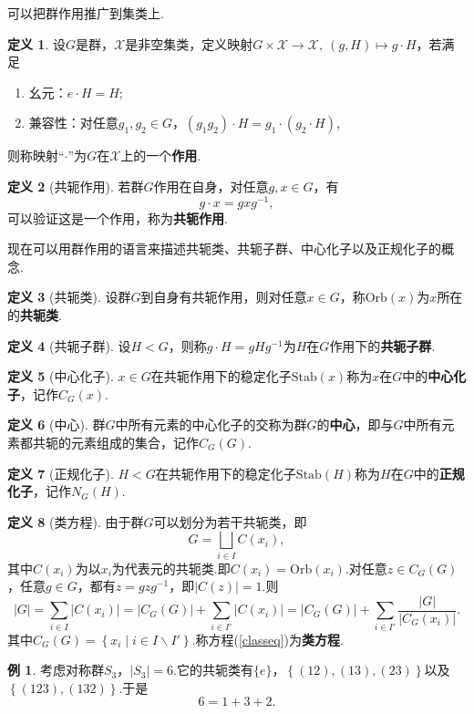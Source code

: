 \documentclass[12pt]{ctexart}
\theoremstyle{definition}
\newtheorem{definition}{定义}[section]
\newtheorem{example}{例}[section]
\theoremstyle{plain}
\newcommand{\Orb}{\mathrm{Orb}}
\newcommand{\Stab}{\mathrm{Stab}}
\begin{document}
可以把群作用推广到集类上.
\begin{definition}
	设$G$是群，$\mathcal{X}$是非空集类，定义映射$G\times \mathcal{X}\to \mathcal{X},\ (g,H)\mapsto g\cdot H$，若满足
	\begin{enumerate}
		\item 幺元：$e\cdot H=H$;
		\item 兼容性：对任意$g_1,g_2\in G$，$(g_1g_2)\cdot H=g_1\cdot(g_2\cdot H)$,
	\end{enumerate}
	则称映射“$\cdot$”为$G$在$\mathcal{X}$上的一个\textbf{作用}.
\end{definition}
\begin{definition}[共轭作用]
	若群$G$作用在自身，对任意$g,x\in G$，有
	$$g\cdot x=gxg^{-1},$$
	可以验证这是一个作用，称为\textbf{共轭作用}.
\end{definition}
现在可以用群作用的语言来描述共轭类、共轭子群、中心化子以及正规化子的概念.
\begin{definition}[共轭类]
	设群$G$到自身有共轭作用，则对任意$x\in G$，称$\Orb(x)$为$x$所在的\textbf{共轭类}.
\end{definition}
\begin{definition}[共轭子群]
	设$H<G$，则称$g\cdot H=gHg^{-1}$为$H$在$G$作用下的\textbf{共轭子群}.
\end{definition}
\begin{definition}[中心化子]
	$x\in G$在共轭作用下的稳定化子$\Stab(x)$称为$x$在$G$中的\textbf{中心化子}，记作$C_G(x)$.
\end{definition}
\begin{definition}[中心]
	群$G$中所有元素的中心化子的交称为群$G$的\textbf{中心}，即与$G$中所有元素都共轭的元素组成的集合，记作$C_G(G)$.
\end{definition}
\begin{definition}[正规化子]
	$H<G$在共轭作用下的稳定化子$\Stab(H)$称为$H$在$G$中的\textbf{正规化子}，记作$N_G(H)$.
\end{definition}
\begin{definition}[类方程]
	由于群$G$可以划分为若干共轭类，即
	$$G=\bigsqcup_{i\in I}C(x_i),$$
	其中$C(x_i)$为以$x_i$为代表元的共轭类.即$C(x_i)=\Orb(x_i)$.对任意$z\in C_G(G)$，任意$g\in G$，都有$z=gzg^{-1}$，即$|C(z)|=1$.则
	\begin{equation}\label{classeq}
		|G|=\sum_{i\in I}|C(x_i)|=|C_G(G)|+\sum_{i\in I'}|C(x_i)|=|C_G(G)|+\sum_{i\in I'}\frac{|G|}{|C_G(x_i)|}.
	\end{equation}
	其中$C_G(G)=\left\{x_i\mid i\in I\backslash I'\right\}$.称方程(\ref{classeq})为\textbf{类方程}.
\end{definition}
\begin{example}
	考虑对称群$S_3$，$|S_3|=6$.它的共轭类有$\{e\}$，$\left\{(12),(13),(23)\right\}$以及$\left\{(123),(132)\right\}$.于是
	$$6=1+3+2.$$
\end{example}
\end{document}
